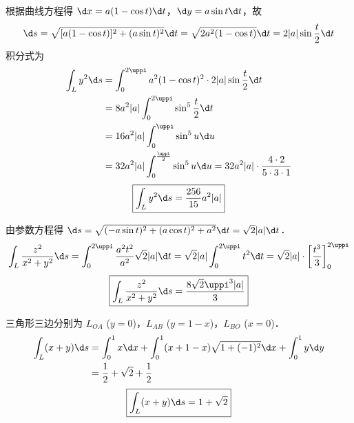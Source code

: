 \begin{solution}

    根据曲线方程得 $\d x = a(1-\cos t) \d t$，$\d y = a \sin t \d t$，故
    \begin{equation}
        \d s = \sqrt{[a(1-\cos t)]^{2}+(a \sin t)^{2}} \d t = \sqrt{2 a^{2}(1-\cos t)} \d t = 2 |a| \sin \frac{t}{2} \d t
    \end{equation}
    积分式为
    \begin{equation}
        \begin{aligned}
            \int_{L} y^{2} \d s & = \int_{0}^{2 \uppi} a^{2}(1-\cos t)^{2} \cdot 2 |a| \sin \frac{t}{2} \d t                                         \\
                                & = 8 a^{2} |a| \int_{0}^{2 \uppi} \sin^{5} \frac{t}{2} \d t                                                         \\
                                & = 16 a^{2} |a| \int_{0}^{\uppi} \sin^{5} u \d u                                                                    \\
                                & = 32 a^{2} |a| \int_{0}^{\frac{\uppi}{2}} \sin^{5} u \d u = 32 a^{2} |a| \cdot \frac{4 \cdot 2}{5 \cdot 3 \cdot 1}
        \end{aligned}
    \end{equation}
    \begin{equation}
        \boxed{\int_{L} y^{2} \d s = \frac{256}{15} a^{2} |a| }
    \end{equation}


    由参数方程得 $\d s = \sqrt{(-a \sin t)^{2}+(a \cos t)^{2}+a^{2}} \d t = \sqrt{2} |a| \d t$．
    \begin{equation}
        \int_{L} \frac{z^{2}}{x^{2}+y^{2}} \d s = \int_{0}^{2 \uppi} \frac{a^{2} t^{2}}{a^{2}} \sqrt{2} |a| \d t = \sqrt{2} |a| \int_{0}^{2 \uppi} t^{2} \d t = \sqrt{2} |a| \cdot \left[ \frac{t^{3}}{3} \right]_{0}^{2 \uppi}
    \end{equation}
    \begin{equation}
        \boxed{\int_{L} \frac{z^{2}}{x^{2}+y^{2}} \d s = \frac{8 \sqrt{2} \uppi^{3} |a| }{3}}
    \end{equation}


    三角形三边分别为 $L_{OA}$ ($y=0$)，$L_{AB}$ ($y=1-x$)，$L_{BO}$ ($x=0$)．
    \begin{equation}
        \begin{aligned}
            \int_{L}(x+y) \d s & = \int_{0}^{1} x \d x + \int_{0}^{1}(x+1-x) \sqrt{1+(-1)^{2}} \d x + \int_{0}^{1} y \d y \\
                               & = \frac{1}{2} + \sqrt{2} + \frac{1}{2}
        \end{aligned}
    \end{equation}
    \begin{equation}
        \boxed{\int_{L}(x+y) \d s = 1+\sqrt{2}}
    \end{equation}


\end{solution}
